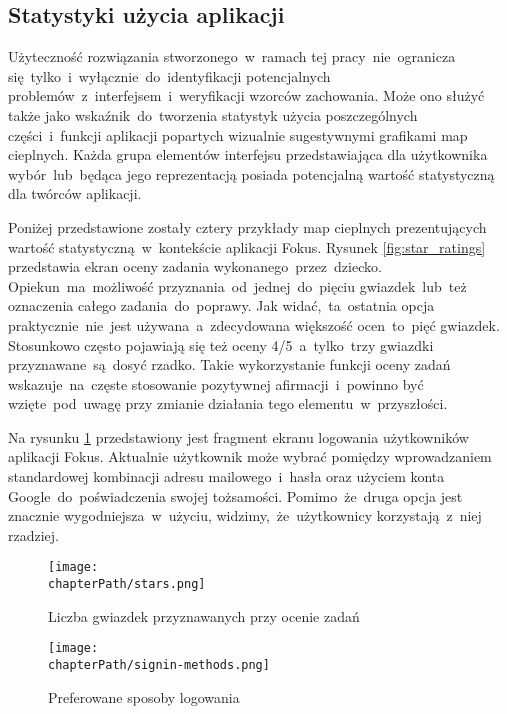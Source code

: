 \subsection{Statystyki użycia aplikacji}
Użyteczność rozwiązania stworzonego~w~ramach tej pracy~nie~ogranicza się~tylko~i~wyłącznie~do~identyfikacji potencjalnych problemów~z~interfejsem~i~weryfikacji wzorców zachowania. Może ono służyć także jako wskaźnik~do~tworzenia statystyk użycia poszczególnych części~i~funkcji aplikacji popartych wizualnie sugestywnymi grafikami map cieplnych. Każda grupa elementów interfejsu przedstawiająca dla użytkownika wybór~lub~będąca jego reprezentacją posiada potencjalną wartość statystyczną dla twórców aplikacji.

Poniżej przedstawione zostały cztery przykłady map cieplnych prezentujących wartość statystyczną~w~kontekście aplikacji Fokus. Rysunek \ref{fig:star_ratings} przedstawia ekran oceny zadania wykonanego~przez~dziecko. Opiekun~ma~możliwość przyznania~od~jednej~do~pięciu gwiazdek~lub~też oznaczenia całego zadania~do~poprawy. Jak widać,~ta~ostatnia opcja praktycznie~nie~jest używana~a~zdecydowana większość ocen~to~pięć gwiazdek. Stosunkowo często pojawiają się też oceny 4/5~a~tylko~trzy gwiazdki przyznawane~są~dosyć rzadko. Takie wykorzystanie funkcji oceny zadań wskazuje~na~częste stosowanie pozytywnej afirmacji~i~powinno być wzięte~pod~uwagę przy zmianie działania tego elementu~w~przyszłości.

Na rysunku \ref{fig:signin_methods} przedstawiony jest fragment ekranu logowania użytkowników aplikacji Fokus. Aktualnie użytkownik może wybrać pomiędzy wprowadzaniem standardowej kombinacji adresu mailowego~i~hasła oraz użyciem konta Google~do~poświadczenia swojej tożsamości. Pomimo~że~druga opcja jest znacznie wygodniejsza~w~użyciu, widzimy,~że~użytkownicy korzystają~z~niej rzadziej.

\bigskip
\begin{figure}[H]
\centering
\begin{minipage}{.45\textwidth}
	\centering
	\texttt{[image: \\chapterPath/stars.png]}
	\bigskip
	\caption{Liczba gwiazdek przyznawanych przy ocenie zadań}
	\label{fig:star_ratings}
\end{minipage}
\begin{minipage}{.45\textwidth}
	\centering
	\texttt{[image: \\chapterPath/signin-methods.png]}
	\bigskip
	\caption{Preferowane sposoby logowania}
	\label{fig:signin_methods}
\end{minipage}
\end{figure}

